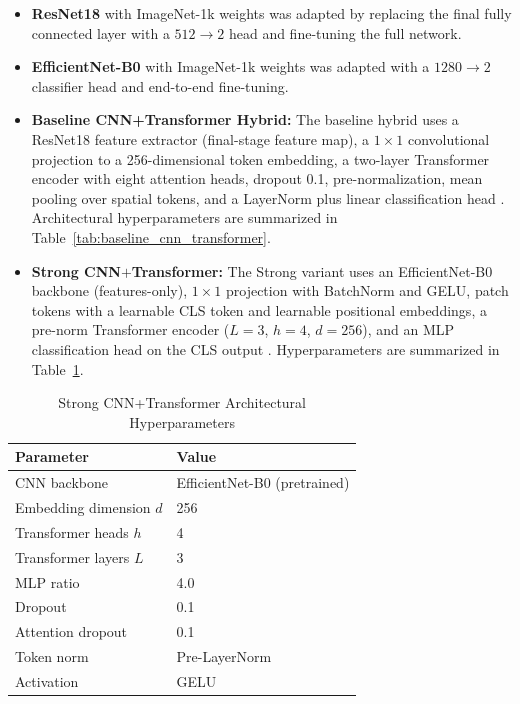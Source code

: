 \documentclass[preprint,12pt,authoryear]{elsarticle}
\begin{document}
\begin{itemize}
\item \textbf{ResNet18} \citep{he2016resnet} with ImageNet-1k weights was adapted by replacing the final fully connected layer with a $512 \rightarrow 2$ head and fine-tuning the full network. 
\item \textbf{EfficientNet-B0} \citep{tan2019efficientnet} with ImageNet-1k weights was adapted with a $1280 \rightarrow 2$ classifier head and end-to-end fine-tuning.
\item \textbf{Baseline CNN+Transformer Hybrid:} The baseline hybrid uses a ResNet18 feature extractor (final-stage feature map), a $1 \times 1$ convolutional projection to a 256-dimensional token embedding, a two-layer Transformer encoder with eight attention heads, dropout 0.1, pre-normalization, mean pooling over spatial tokens, and a LayerNorm plus linear classification head \citep{rw2019timm}. Architectural hyperparameters are summarized in Table~\ref{tab:baseline_cnn_transformer}.
\item \textbf{Strong CNN$+$Transformer:} The Strong variant uses an EfficientNet-B0 backbone (features-only), $1 \times 1$ projection with BatchNorm and GELU, patch tokens with a learnable CLS token and learnable positional embeddings, a pre-norm Transformer encoder ($L{=}3$, $h{=}4$, $d{=}256$), and an MLP classification head on the CLS output \citep{rw2019timm}. Hyperparameters are summarized in Table~\ref{strongconfig}.
\end{itemize}



\begin{table}
  \caption{Strong CNN+Transformer Architectural Hyperparameters}
  \label{strongconfig}
  \centering
  \begin{tabular}{ll}
    \toprule
    \textbf{Parameter}        & \textbf{Value} \\
    \midrule
    CNN backbone              & EfficientNet-B0 (pretrained) \\
    Embedding dimension $d$   & 256 \\
    Transformer heads $h$     & 4 \\
    Transformer layers $L$    & 3 \\
    MLP ratio                 & 4.0 \\
    Dropout                   & 0.1 \\
    Attention dropout         & 0.1 \\
    Token norm                & Pre-LayerNorm \\
    Activation                & GELU \\
    \bottomrule
  \end{tabular}
\end{table}
\end{document}
